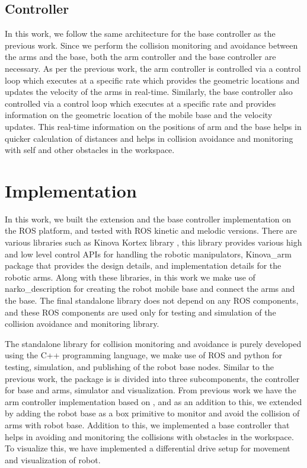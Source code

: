 \documentclass[a4paper, 11.5pt, conference]{ieeeconf}      %
\begin{document}
\subsection{Controller} 
In this work, we follow the same architecture for the base controller as the previous work. Since we perform the collision monitoring and avoidance between the arms and the base, both the arm controller and the base controller are necessary. As per the previous work, the arm controller is controlled via a control loop which executes at a specific rate which provides the geometric locations and updates the velocity of the arms in real-time. Similarly, the base controller also controlled via a control loop which executes at a specific rate and provides information on the geometric location of the mobile base and the velocity updates. This real-time information on the positions of arm and the base helps in quicker calculation of distances and helps in collision avoidance and monitoring with self and other obstacles in the workspace.
 
\section{Implementation}
In this work, we built the extension and the base controller implementation on the ROS platform, and tested with ROS kinetic and melodic versions. There are various libraries such as Kinova Kortex library \cite{kortex}, this library provides various high and low level control APIs for handling the robotic manipulators, Kinova\_arm package that provides the design details, and implementation details for the robotic arms. Along with these libraries, in this work we make use of narko\_description for creating the robot mobile base and connect the arms and the base. The final standalone library does not depend on any ROS components, and these ROS components are used only for testing and simulation of the collision avoidance and monitoring library.

The standalone library for collision monitoring and avoidance is purely developed using the C++ programming language, we make use of ROS and python for testing, simulation, and publishing of the robot base nodes. Similar to the previous work, the package is is divided into three subcomponents, the controller for base and arms, simulator and visualization. From previous work we have the arm controller implementation based on \cite{Hoffmann}, and as an addition to this, we extended by adding the robot base as a box primitive to monitor and avoid the collision of arms with robot base. Addition to this, we implemented a base controller that helps in avoiding and monitoring the collisions with obstacles in the workspace. To visualize this, we have implemented a differential drive setup for movement and visualization of robot.
\end{document}
